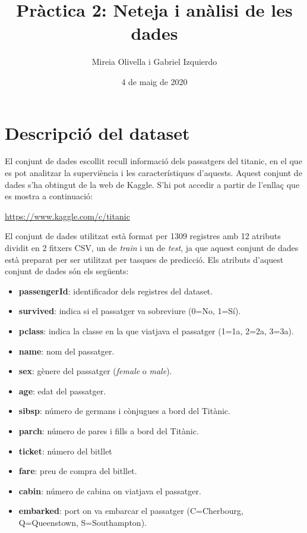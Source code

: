 \documentclass[]{article}
\title{Pràctica 2: Neteja i anàlisi de les dades}
\author{Mireia Olivella i Gabriel Izquierdo}
\date{4 de maig de 2020}
\providecommand{\tightlist}{%
  \setlength{\itemsep}{0pt}\setlength{\parskip}{0pt}}
\begin{document}
\maketitle

{
\hypersetup{linkcolor=black}
\setcounter{tocdepth}{3}
\tableofcontents
}
\pagebreak

\hypertarget{descripciuxf3-del-dataset}{%
\section{Descripció del dataset}\label{descripciuxf3-del-dataset}}

El conjunt de dades escollit recull informació dels passatgers del
titanic, en el que es pot analitzar la superviència i les
característiques d'aquests. Aquest conjunt de dades s'ha obtingut de la
web de Kaggle. S'hi pot accedir a partir de l'enllaç que es mostra a
continuació:

\url{https://www.kaggle.com/c/titanic}

El conjunt de dades utilitzat està format per 1309 registres amb 12
atributs dividit en 2 fitxers CSV, un de \emph{train} i un de
\emph{test}, ja que aquest conjunt de dades està preparat per ser
utilitzat per tasques de predicció. Els atributs d'aquest conjunt de
dades són els següents:

\begin{itemize}
\tightlist
\item
  \textbf{passengerId}: identificador dels registres del dataset.
\item
  \textbf{survived}: indica si el passatger va sobreviure (0=No, 1=Sí).
\item
  \textbf{pclass}: indica la classe en la que viatjava el passatger
  (1=1a, 2=2a, 3=3a).
\item
  \textbf{name}: nom del passatger.
\item
  \textbf{sex}: gènere del passatger (\emph{female} o \emph{male}).
\item
  \textbf{age}: edat del passatger.
\item
  \textbf{sibsp}: número de germans i cònjugues a bord del Titànic.
\item
  \textbf{parch}: número de pares i fills a bord del Titànic.
\item
  \textbf{ticket}: número del bitllet
\item
  \textbf{fare}: preu de compra del bitllet.
\item
  \textbf{cabin}: número de cabina on viatjava el passatger.
\item
  \textbf{embarked}: port on va embarcar el passatger (C=Cherbourg,
  Q=Queenstown, S=Southampton).
\end{itemize}
\end{document}
